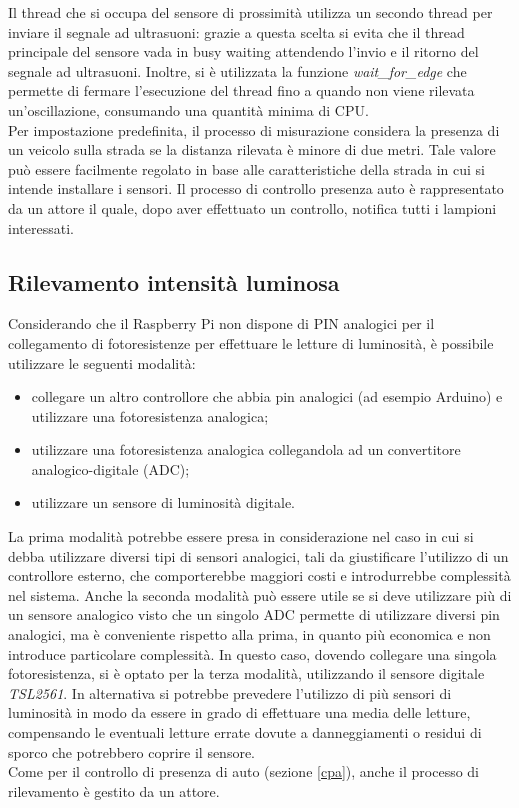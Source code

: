 Il thread che si occupa del sensore di prossimità utilizza un secondo thread per inviare il segnale ad ultrasuoni: grazie a questa scelta si evita che il thread principale del sensore vada in busy waiting attendendo l'invio e il ritorno del segnale ad ultrasuoni.
Inoltre, si è utilizzata la funzione \textit{wait\_for\_edge} che permette di fermare l'esecuzione del thread fino a quando non viene rilevata un'oscillazione, consumando una quantità minima di CPU.
\\Per impostazione predefinita, il processo di misurazione considera la presenza di un veicolo sulla strada se la distanza rilevata è minore di due metri.
Tale valore può essere facilmente regolato in base alle caratteristiche della strada in cui si intende installare i sensori.
Il processo di controllo presenza auto è rappresentato da un attore il quale, dopo aver effettuato un controllo, notifica tutti i lampioni interessati.

\newpage


\subsection{Rilevamento intensità luminosa}
Considerando che il Raspberry Pi non dispone di PIN analogici per il collegamento di fotoresistenze per effettuare le letture di luminosità, è possibile utilizzare le seguenti modalità:
\begin{itemize}
 \item collegare un altro controllore che abbia pin analogici (ad esempio Arduino) e utilizzare una fotoresistenza analogica;
 \item utilizzare una fotoresistenza analogica collegandola ad un convertitore analogico-digitale (ADC);
 \item utilizzare un sensore di luminosità digitale.
\end{itemize}
La prima modalità potrebbe essere presa in considerazione nel caso in cui si debba utilizzare diversi tipi di sensori analogici, tali da giustificare l'utilizzo di un controllore esterno, che comporterebbe maggiori costi e introdurrebbe complessità nel sistema.
Anche la seconda modalità può essere utile se si deve utilizzare più di un sensore analogico visto che un singolo ADC permette di utilizzare diversi pin analogici, ma è conveniente rispetto alla prima, in quanto più economica e non introduce particolare complessità.
In questo caso, dovendo collegare una singola fotoresistenza, si è optato per la terza modalità, utilizzando il sensore digitale \textit{TSL2561}.
In alternativa si potrebbe prevedere l'utilizzo di più sensori di luminosità in modo da essere in grado di effettuare una media delle letture, compensando le eventuali letture errate dovute a danneggiamenti o residui di sporco che potrebbero coprire il sensore.
\\Come per il controllo di presenza di auto (sezione \ref{cpa}), anche il processo di rilevamento è gestito da un attore.

